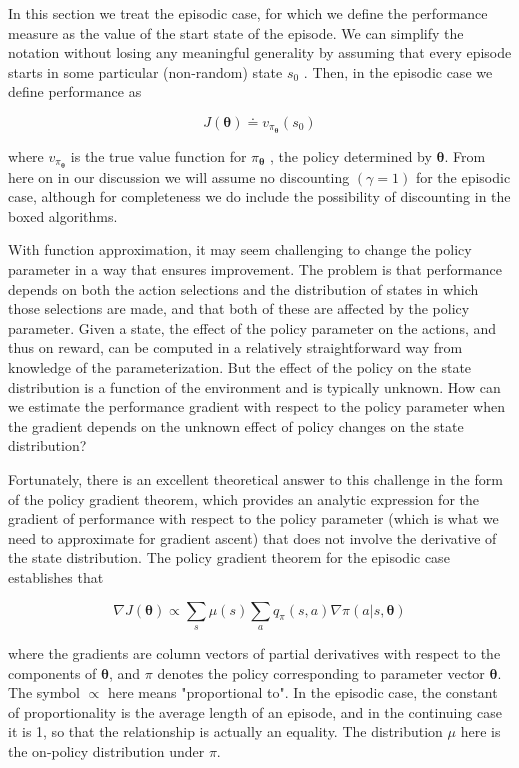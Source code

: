 \documentclass{article}
\begin{document}
In this section we treat the episodic case, for which we define the performance measure as the value of the start state of the episode. We can simplify the notation without losing any meaningful generality by assuming that every episode starts in some particular (non-random) state $s _ { 0 }$ . 
Then, in the episodic case we define performance as

$$
J ( \pmb { \theta } ) \doteq v _ { \pi _ { \pmb { \theta } } } ( s _ { 0 } )
$$

where $v _ { \pi _ { \pmb { \theta } } }$ is the true value function for $\pi _ { \pmb{\theta} }$ , the policy determined by $\pmb{\theta}$. From here on in our discussion we will assume no discounting $( \gamma = 1 )$ for the episodic case, although for completeness we do include the possibility of discounting in the boxed algorithms.

With function approximation, it may seem challenging to change the policy parameter in a way that ensures improvement. The problem is that performance depends on both the action selections and the distribution of states in which those selections are made, and that both of these are affected by the policy parameter. Given a state, 
the effect of the policy parameter on the actions, and thus on reward, can be computed in a relatively straightforward way from knowledge of the parameterization. But the effect of the policy on the state distribution is a function of the environment and is typically unknown. How can we estimate the performance gradient 
with respect to the policy parameter when the gradient depends on the unknown effect of policy changes on the state distribution?

Fortunately, there is an excellent theoretical answer to this challenge in the form of the policy gradient theorem, which provides an analytic expression for the gradient of performance with respect to the policy parameter (which is what we need to approximate for gradient ascent) that does not involve the derivative of the state distribution. 
The policy gradient theorem for the episodic case establishes that

$$
\nabla J ( \pmb { \theta } ) \propto \sum _ { s } \mu ( s ) \sum _ { a } q _ { \pi } ( s , a ) \nabla \pi ( a | s , \pmb { \theta } )
$$

where the gradients are column vectors of partial derivatives with respect to the components of $\pmb { \theta }$, and $\pi$ denotes the policy corresponding to parameter vector $\pmb{\theta}$. The symbol $\propto$ here means "proportional to". In the episodic case, the constant of proportionality is the average length of an episode, 
and in the continuing case it is 1, so that the relationship is actually an equality. The distribution $\mu$ here is the on-policy distribution under $\pi$.
\end{document}
